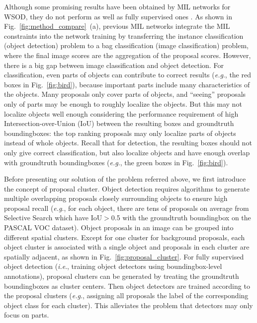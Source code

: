 \documentclass[10pt,journal,compsoc]{IEEEtran}
\def\eg{\emph{e.g}.} \def\Eg{\emph{E.g}.}
\def\ie{\emph{i.e}.} \def\Ie{\emph{I.e}.}
\begin{document}
Although some promising results have been obtained by MIL networks for WSOD,
they do not perform as well as fully supervised ones \cite{Ref:Girshick2016,Ref:Girshick2015,Ref:Ren2017}.
As shown in Fig.~\ref{fig:method_compare}~(a),
previous MIL networks integrate the MIL constraints into the network training by transferring the instance classification (object detection) problem to a bag classification (image classification) problem,
where the final image scores are the aggregation of the proposal scores.
However, there is a big gap between image classification and object detection.
For classification, even parts of objects can contribute to correct results (\eg, the red boxes in Fig.~\ref{fig:bird}),
because important parts include many characteristics of the objects.
Many proposals only cover parts of objects,
and ``seeing'' proposals only of parts may be enough to roughly localize the objects.
But this may not localize objects well enough considering the performance requirement of high Intersection-over-Union (IoU) between the resulting boxes and groundtruth boundingboxes:
the top ranking proposals may only localize parts of objects instead of whole objects.
Recall that for detection, the resulting boxes should not only give correct classification,
but also localize objects and have enough overlap with groundtruth boundingboxes (\eg, the green boxes in Fig.~\ref{fig:bird}).

Before presenting our solution of the problem referred above,
we first introduce the concept of proposal cluster.
Object detection requires algorithms to generate multiple overlapping proposals closely surrounding objects to ensure high proposal recall
(\eg, for each object, there are tens of proposals on average from Selective Search \cite{Ref:Uijlings2013} which have IoU$>$0.5 with the groundtruth boundingbox on the PASCAL VOC dataset).
Object proposals in an image can be grouped into different spatial clusters.
Except for one cluster for background proposals,
each object cluster is associated with a single object
and proposals in each cluster are spatially adjacent,
as shown in Fig.~\ref{fig:proposal_cluster}.
For fully supervised object detection
(\ie, training object detectors using boundingbox-level annotations), 
proposal clusters can be generated
by treating the groundtruth boundingboxes as cluster centers.
Then object detectors are trained according to the proposal clusters
(\eg, assigning all proposals the label of the corresponding object class for each cluster).
This alleviates the problem that detectors may only focus on parts.
\end{document}
